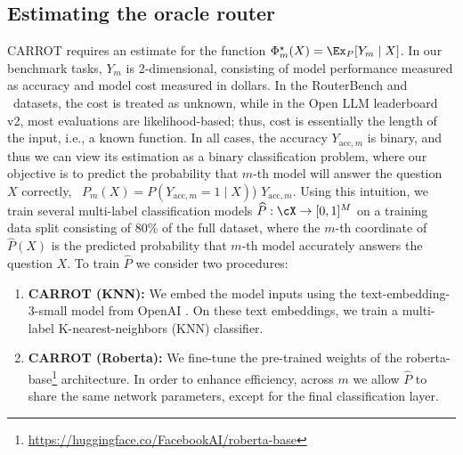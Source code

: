
\subsection{Estimating the oracle router}
CARROT requires an estimate for the function $\Phi^\star_m(X) = \Ex_P[ Y_m\mid X]$. In our benchmark tasks, $Y_m$ is 2-dimensional, consisting of model performance measured as accuracy and model cost measured in dollars. In the RouterBench and \newdata\ datasets, the cost is treated as unknown, while in the Open LLM leaderboard v2, most evaluations are likelihood-based; thus, cost is essentially the length of the input, i.e., a known function. In all cases, the accuracy $Y_{\text{acc}, m}$ is binary, and thus %
we can view its estimation as a binary classification problem, where our objective is to predict the probability that $m$-th model will answer the question $X$ correctly, \ie\ $P_m(X) = P(Y_{\text{acc}, m} = 1\mid X)$) $Y_{\text{acc}, m}$. Using this intuition, we train several multi-label classification models $\widehat P: \cX \to [0, 1]^M$ on a training data split consisting of $80\%$ of the full dataset, where the $m$-th coordinate of $\widehat{P}(X)$ is the predicted probability that $m$-th model accurately answers the question $X$. %
To train $\widehat P$ we consider two procedures: 
\begin{enumerate}
    \item  {\bf CARROT (KNN):} We embed the model inputs using the {text-embedding-3-small} model from OpenAI \citep{openai2023textembedding3small}. On these text embeddings, we train a multi-label K-nearest-neighbors (KNN) classifier.

    \item {\bf CARROT (Roberta):} We fine-tune the pre-trained weights of the {{roberta-base}}\footnote{\url{https://huggingface.co/FacebookAI/roberta-base}} architecture. In order to enhance efficiency, across $m$ we allow $\hat{P}$ to share the same network parameters, except for the final classification layer.
    
\end{enumerate}
